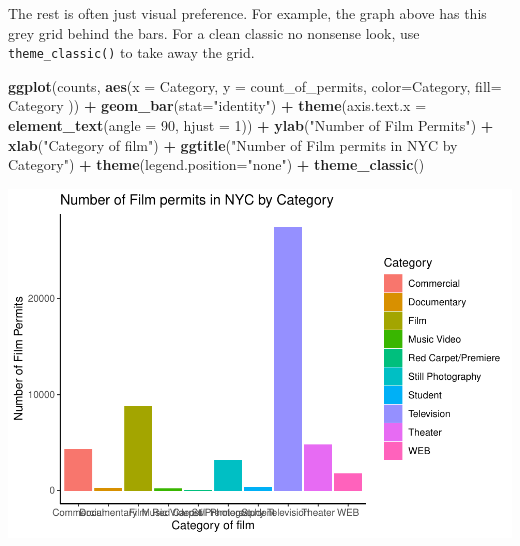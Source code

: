 \documentclass[]{book}
\newenvironment{Shaded}{\begin{snugshade}}{\end{snugshade}}
\newcommand{\KeywordTok}[1]{\textcolor[rgb]{0.13,0.29,0.53}{\textbf{#1}}}
\newcommand{\DataTypeTok}[1]{\textcolor[rgb]{0.13,0.29,0.53}{#1}}
\newcommand{\DecValTok}[1]{\textcolor[rgb]{0.00,0.00,0.81}{#1}}
\newcommand{\StringTok}[1]{\textcolor[rgb]{0.31,0.60,0.02}{#1}}
\newcommand{\OperatorTok}[1]{\textcolor[rgb]{0.81,0.36,0.00}{\textbf{#1}}}
\newcommand{\NormalTok}[1]{#1}
\begin{document}
The rest is often just visual preference. For example, the graph above
has this grey grid behind the bars. For a clean classic no nonsense
look, use \texttt{theme\_classic()} to take away the grid.

\begin{Shaded}
\begin{Highlighting}[]
\KeywordTok{ggplot}\NormalTok{(counts, }\KeywordTok{aes}\NormalTok{(}\DataTypeTok{x =}\NormalTok{ Category, }\DataTypeTok{y =}\NormalTok{ count_of_permits, }
                   \DataTypeTok{color=}\NormalTok{Category, }
                   \DataTypeTok{fill=}\NormalTok{ Category )) }\OperatorTok{+}
\StringTok{  }\KeywordTok{geom_bar}\NormalTok{(}\DataTypeTok{stat=}\StringTok{"identity"}\NormalTok{) }\OperatorTok{+}\StringTok{ }
\StringTok{  }\KeywordTok{theme}\NormalTok{(}\DataTypeTok{axis.text.x =} \KeywordTok{element_text}\NormalTok{(}\DataTypeTok{angle =} \DecValTok{90}\NormalTok{, }\DataTypeTok{hjust =} \DecValTok{1}\NormalTok{)) }\OperatorTok{+}
\StringTok{  }\KeywordTok{ylab}\NormalTok{(}\StringTok{"Number of Film Permits"}\NormalTok{) }\OperatorTok{+}\StringTok{ }
\StringTok{  }\KeywordTok{xlab}\NormalTok{(}\StringTok{"Category of film"}\NormalTok{) }\OperatorTok{+}
\StringTok{  }\KeywordTok{ggtitle}\NormalTok{(}\StringTok{"Number of Film permits in NYC by Category"}\NormalTok{) }\OperatorTok{+}
\StringTok{  }\KeywordTok{theme}\NormalTok{(}\DataTypeTok{legend.position=}\StringTok{"none"}\NormalTok{) }\OperatorTok{+}
\StringTok{  }\KeywordTok{theme_classic}\NormalTok{()}
\end{Highlighting}
\end{Shaded}

\includegraphics{Statistics_Lab_files/figure-latex/1categoryI-1.pdf}
\end{document}
